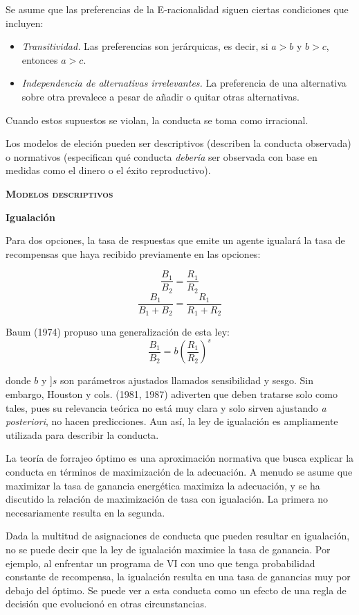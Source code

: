 \documentclass[a4paper,12pt]{article}
\begin{document}
Se asume que las preferencias de la E-racionalidad siguen ciertas condiciones que incluyen:

\begin{itemize}
	\item {\slshape Transitividad.} Las preferencias son jerárquicas, es decir, si $a > b$ y $b > c$, entonces $a > c$.
	\item {\slshape Independencia de alternativas irrelevantes.} La preferencia de una alternativa sobre otra prevalece a pesar de añadir o quitar otras alternativas.
\end{itemize}

Cuando estos supuestos se violan, la conducta se toma como irracional.

Los modelos de eleción pueden ser descriptivos (describen la conducta observada) o normativos (especifican qué conducta {\slshape debería}  ser observada con base en medidas como el dinero o el éxito reproductivo). 

{\scshape\bfseries Modelos descriptivos}

{\bfseries Igualación}

Para dos opciones, la tasa de respuestas que emite un agente igualará la tasa de recompensas que haya recibido previamente en las opciones:

$$\frac{B_1}{B_2}=\frac{R_1}{R_2}$$
$$\frac{B_1}{B_1+B_2}=\frac{R_1}{R_1+R_2}$$

Baum (1974) propuso una generalización de esta ley:
$$\frac{B_1}{B_2}=b\left(\frac{R_1}{R_2}\right)^s$$

donde $b$ y ]$s$ son parámetros ajustados llamados sensibilidad y sesgo. Sin embargo, Houston y cols. (1981, 1987) adiverten que deben tratarse solo como tales, pues su relevancia teórica no está muy clara y solo sirven ajustando {\slshape a posteriori}, no hacen predicciones. Aun así, la ley de igualación es ampliamente utilizada para describir la conducta.

La teoría de forrajeo óptimo es una aproximación normativa que busca explicar la conducta en términos de maximización de la adecuación. A menudo se asume que maximizar la tasa de ganancia energética maximiza la adecuación, y se ha discutido la relación de maximización de tasa con igualación. La primera no necesariamente resulta en la segunda.

Dada la multitud de asignaciones de conducta que pueden resultar en igualación, no se puede decir que la ley de igualación maximice la tasa de ganancia. Por ejemplo, al enfrentar un programa de VI con uno que tenga probabilidad constante de recompensa, la igualación resulta en una tasa de ganancias muy por debajo del óptimo. Se puede ver a esta conducta como un efecto de una regla de decisión que evolucionó en otras circunstancias.
\end{document}
